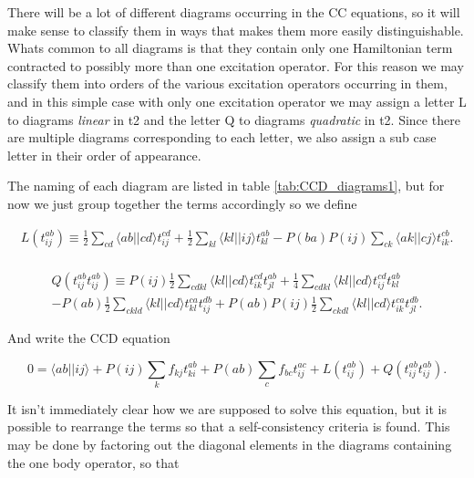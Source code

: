 There will be a lot of different diagrams occurring in the CC equations, so it will make sense to classify them in ways that makes them more easily distinguishable. Whats common to all diagrams is that they contain only one Hamiltonian term contracted to possibly more than one excitation operator. For this reason we may classify them into orders of the various excitation operators occurring in them, and in this simple case with only one excitation operator we may assign a letter L to diagrams \emph{linear} in t2 and the letter Q to diagrams \emph{quadratic} in t2. Since there are multiple diagrams corresponding to each letter, we also assign a sub case letter in their order of appearance.

The naming of each diagram are listed in table \ref{tab:CCD_diagrams1}, but for now we just group together the terms accordingly so we define

\begin{multline}
L(t^{ab}_{ij}) \equiv 
\frac{1}{2} \sum_{cd} \langle ab \vert \vert cd \rangle t_{ij}^{cd} +
\frac{1}{2} \sum_{kl} \langle kl \vert \vert ij \rangle t_{kl}^{ab}-
P(ba)P(ij) \sum_{ck} \langle ak \vert \vert cj \rangle t_{ik}^{cb} .\\ 
\end{multline}

\begin{multline}
Q(t^{ab}_{ij}t^{ab}_{ij}) \equiv 
P(ij)\frac{1}{2} \sum_{cdkl} \langle kl \vert \vert cd \rangle t_{ik}^{cd} t_{jl}^{ab} 
+\frac{1}{4} \sum_{cdkl} \langle kl \vert \vert cd \rangle t_{ij}^{cd} t_{kl}^{ab} \\ - 
P(ab)\frac{1}{2} \sum_{ckld} \langle kl \vert \vert cd \rangle t_{kl}^{ca} t_{ij}^{db}+
P(ab)P(ij)\frac{1}{2} \sum_{ckdl} \langle kl \vert \vert cd \rangle t_{ik}^{ca} t_{jl}^{db}.
\end{multline}

And write the CCD equation

\begin{equation}
0 =\langle ab \vert \vert ij \rangle + P(ij) \sum_{k} f_{kj} t_{ki}^{ab}+P(ab) \sum_{c} f_{bc} t_{ij}^{ac} + L(t^{ab}_{ij}) + Q(t^{ab}_{ij}t^{ab}_{ij}).
\end{equation}


It isn't immediately clear how we are supposed to solve this equation, but it is possible to rearrange the terms so that a self-consistency criteria is found. This may be done by factoring out the diagonal elements in the diagrams containing the one body operator, so that 

